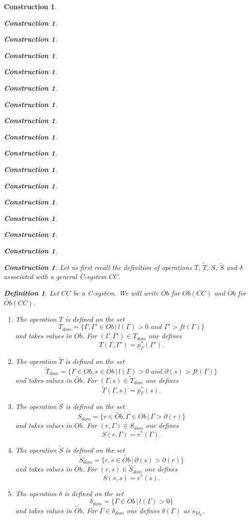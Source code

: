 \documentclass[onecolumn,12pt]{amsart}
\newtheorem{definition}[proposition]{Definition}
\numberwithin{proposition}{subsection}
\newtheorem{construction}[proposition]{Construction}
\newcommand{\wt}{\widetilde}
\begin{document}
\begin{construction}
\begin{construction}
\begin{construction}
\begin{construction}
\begin{construction}
\begin{construction}
\begin{construction}
\begin{construction}
\begin{construction}
\begin{construction}
\begin{construction}
\begin{construction}
\begin{construction}
\begin{construction}
\begin{construction}
\begin{construction}
\begin{construction}
Let us first recall the definition of operations $T$, $\wt{T}$, $S$, $\wt{S}$
and $\delta$ associated with a general C-system $CC$.
%
\begin{definition}
\label{2015.08.26.def1}
Let $CC$ be a C-system. We will write $Ob$ for $Ob(CC)$ and $\wt{Ob}$ for $\wt{Ob}(CC)$. 
%
%
\begin{enumerate}
\item The operation $T$ is defined on the set
%
\[T_{dom}=\{\Gamma,\Gamma'\in Ob\,|\,l(\Gamma)>0\,\,and\,\, \Gamma'>ft(\Gamma)\}\]
%
and takes values in $Ob$. For $(\Gamma,\Gamma')\in T_{dom}$ one defines
%
\[T(\Gamma,\Gamma')=p_{\Gamma}^*(\Gamma').\]
%
\item The operation $\wt{T}$ is defined on the set
%
\[\wt{T}_{dom}=\{\Gamma\in Ob, s\in \wt{Ob}\,|\,l(\Gamma)>0\,\,and\,\, \partial(s)>ft(\Gamma)\}\]
%
and takes values in $\wt{Ob}$. For $(\Gamma,s)\in \wt{T}_{dom}$ one defines
%
\[\wt{T}(\Gamma,s)=p_{\Gamma}^*(s).\]
%
\item The operation $S$ is defined on the set
%
\[S_{dom}=\{r\in \wt{Ob}, \Gamma\in Ob\,|\,\Gamma>\partial(r)\}\]
%
and takes values in $Ob$. For $(r,\Gamma)\in S_{dom}$ one defines
%
\[S(r,\Gamma)=r^*(\Gamma).\]
%
\item The operation $\wt{S}$ is defined on the set 
%
\[\wt{S}_{dom}=\{r,s\in \wt{Ob}\,|\,\partial(s)>\partial(r)\}\]
%
and takes values in $\wt{Ob}$. For $(r,s)\in \wt{S}_{dom}$ one defines
%
\[S(r,s)=r^*(s).\]
%
\item The operation $\delta$ is defined on the set 
%
\[\delta_{dom}=\{\Gamma\in Ob\,|\,l(\Gamma)>0\}\]
%
and takes values in $\wt{Ob}$. For $\Gamma\in \delta_{dom}$ one defines $\delta(\Gamma)$ as $s_{Id_{\Gamma}}$. 
\end{enumerate}
\end{definition}
%


\end{construction}
\end{construction}
\end{construction}
\end{construction}
\end{construction}
\end{construction}
\end{construction}
\end{construction}
\end{construction}
\end{construction}
\end{construction}
\end{construction}
\end{construction}
\end{construction}
\end{construction}
\end{construction}
\end{construction}
\end{document}
